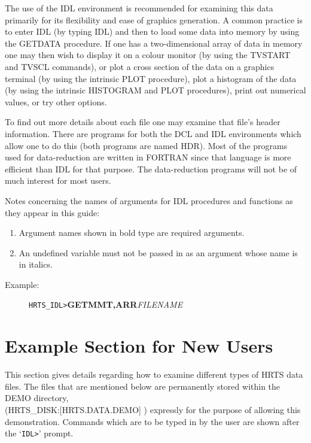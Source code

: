 The use of the IDL environment is recommended for examining this data primarily
for its flexibility and ease of graphics generation. A common practice is to
enter IDL (by typing IDL) and then to load some data into memory by using the 
GETDATA  procedure. If one has a two-dimensional array of data in memory one
may then wish to display it on a colour monitor (by using the TVSTART and TVSCL
commands), or plot a cross section of the data on a graphics terminal (by using
the intrinsic PLOT procedure), plot a histogram of the data (by using the
intrinsic HISTOGRAM and PLOT procedures), print out numerical values, or try
other options. 

To find out more details about each file one may examine that file's header
information. There are programs for both the DCL and IDL environments which
allow one to do this (both programs are named  HDR). Most of the programs used
for data-reduction are written in FORTRAN since that language is more efficient
than IDL for that purpose. The data-reduction programs will not be of much
interest for most users.

Notes concerning the names of arguments for IDL procedures and functions as
they appear in this guide:
\begin{enumerate}   
\item Argument names shown in bold type are required arguments.
\item An undefined variable must not be passed in as an argument whose name is 
in italics.
\end{enumerate}
\begin{description}
\item [Example: ] {\tt HRTS\_IDL>}{\bf GETMMT,ARR}{\it FILENAME}
\end{description}

\newpage

\section{Example Section for New Users}


This section gives details regarding how to examine different types of HRTS
data files.  The files that are mentioned below are permanently stored within
the DEMO directory, \\(HRTS\_DISK:[HRTS.DATA.DEMO] ) expressly for the purpose
of allowing this demonstration.  Commands which are to be typed in by the user
are shown after the `\verb+IDL>+' prompt.

